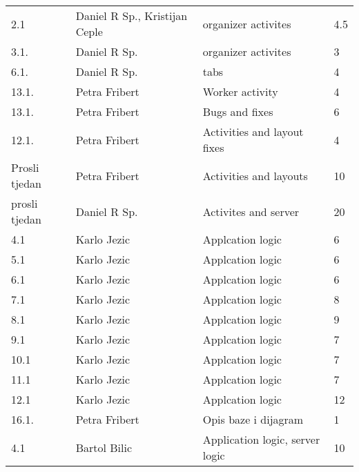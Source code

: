 \begin{longtable}{llll}
			2.1              & Daniel R Sp., Kristijan Ceple & organizer activites             & 4.5       \\
			3.1.             & Daniel R Sp.                  & organizer activites             & 3         \\
			6.1.             & Daniel R Sp.                  & tabs                            & 4         \\
			13.1.            & Petra Fribert                 & Worker activity                 & 4         \\
			13.1.            & Petra Fribert                 & Bugs and fixes                  & 6         \\
			12.1.            & Petra Fribert                 & Activities and layout fixes     & 4         \\
			Prosli tjedan    & Petra Fribert                 & Activities and layouts          & 10        \\
			prosli tjedan    & Daniel R Sp.                  & Activites and server            & 20        \\
			4.1              & Karlo Jezic                   & Applcation logic                & 6         \\
			5.1              & Karlo Jezic                   & Applcation logic                & 6         \\
			6.1              & Karlo Jezic                   & Applcation logic                & 6         \\
			7.1              & Karlo Jezic                   & Applcation logic                & 8         \\
			8.1              & Karlo Jezic                   & Applcation logic                & 9         \\
			9.1              & Karlo Jezic                   & Applcation logic                & 7         \\
			10.1             & Karlo Jezic                   & Applcation logic                & 7         \\
			11.1             & Karlo Jezic                   & Applcation logic                & 7         \\
			12.1             & Karlo Jezic                   & Applcation logic                & 12        \\
			16.1.            & Petra Fribert                 & Opis baze i dijagram            & 1         \\
			4.1              & Bartol Bilic                  & Application logic, server logic & 10        \\

\end{longtable}
